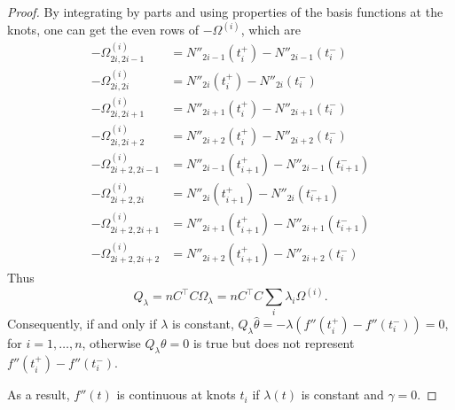 \begin{proof}
By integrating by parts and using properties of the basis functions at the knots, one can get the even rows of $-\Omega^{(i)}$, which are 
\begin{align*}
-\Omega^{(i)}_{2i,2i-1}&=N''_{2i-1}(t_i^+) - N''_{2i-1}(t_i^-)  \\
-\Omega^{(i)}_{2i,2i}&=N''_{2i}(t_i^+) - N''_{2i}(t_i^-)  \\
-\Omega^{(i)}_{2i,2i+1}&=N''_{2i+1}(t_i^+) - N''_{2i+1}(t_i^-) \\
-\Omega^{(i)}_{2i,2i+2}&=N''_{2i+2}(t_i^+) - N''_{2i+2}(t_i^-) \\
-\Omega^{(i)}_{2i+2,2i-1}&=N''_{2i-1}(t_{i+1}^+) - N''_{2i-1}(t_{i+1}^-) \\
-\Omega^{(i)}_{2i+2,2i}&=N''_{2i}(t_{i+1}^+) - N''_{2i}(t_{i+1}^-) \\
-\Omega^{(i)}_{2i+2,2i+1}&=N''_{2i+1}(t_{i+1}^+) - N''_{2i+1}(t_{i+1}^-) \\
-\Omega^{(i)}_{2i+2,2i+2}&=N''_{2i+2}(t_{i+1}^+) - N''_{2i+2}(t_i^-) 
\end{align*}
Thus 
\begin{equation*}
Q_\lambda = nC^\top C\Omega_\lambda = nC^\top C\sum_i\lambda_i \Omega^{(i)}.
\end{equation*}
Consequently, if and only if $\lambda$ is constant, $Q_\lambda\hat{\theta}=-\lambda\left( f''(t_i^+)-f''(t_i^-)\right)=0$, for $i=1,\ldots,n$, otherwise $Q_\lambda\theta=0$ is true but does not represent $f''(t_i^+)-f''(t_i^-)$. 

As a result, $f''(t)$ is continuous at knots $t_i$ if $\lambda(t)$ is constant and $\gamma=0$. 


\end{proof}




